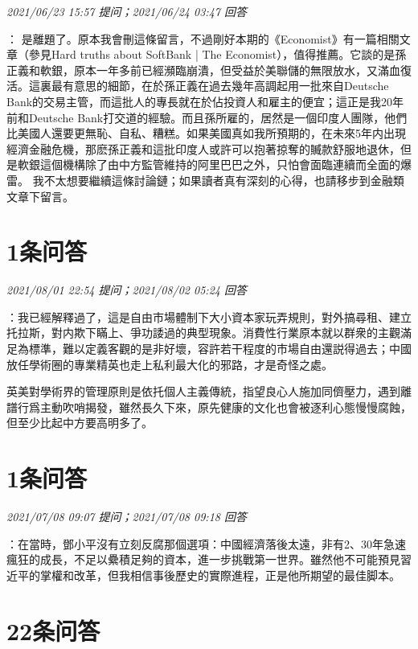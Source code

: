 \documentclass[twocolumn]{ctexart}
\begin{document}
\textit{\hfill\noindent\small 2021/06/23 15:57 提问；2021/06/24 03:47 回答}

：
是離題了。原本我會刪這條留言，不過剛好本期的《Economist》有一篇相關文章（參見Hard truths about SoftBank | The Economist），值得推薦。它談的是孫正義和軟銀，原本一年多前已經瀕臨崩潰，但受益於美聯儲的無限放水，又滿血復活。這裏最有意思的細節，在於孫正義在過去幾年高調起用一批來自Deutsche Bank的交易主管，而這批人的專長就在於佔投資人和雇主的便宜；這正是我20年前和Deutsche Bank打交道的經驗。而且孫所雇的，居然是一個印度人團隊，他們比美國人還要更無恥、自私、糟糕。如果美國真如我所預期的，在未來5年内出現經濟金融危機，那麽孫正義和這批印度人或許可以抱著掠奪的贓款舒服地退休，但是軟銀這個機構除了由中方監管維持的阿里巴巴之外，只怕會面臨連續而全面的爆雷。
我不太想要繼續這條討論鏈；如果讀者真有深刻的心得，也請移步到金融類文章下留言。
\\

\section{1条问答}

\textit{\hfill\noindent\small 2021/08/01 22:54 提问；2021/08/02 05:24 回答}

：我已經解釋過了，這是自由市場體制下大小資本家玩弄規則，對外搞尋租、建立托拉斯，對内欺下瞞上、爭功諉過的典型現象。消費性行業原本就以群衆的主觀滿足為標準，難以定義客觀的是非好壞，容許若干程度的市場自由還説得過去；中國放任學術圈的專業精英也走上私利最大化的邪路，才是奇怪之處。

英美對學術界的管理原則是依托個人主義傳統，指望良心人施加同儕壓力，遇到離譜行爲主動吹哨揭發，雖然長久下來，原先健康的文化也會被逐利心態慢慢腐蝕，但至少比起中方要高明多了。
\\

\section{1条问答}

\textit{\hfill\noindent\small 2021/07/08 09:07 提问；2021/07/08 09:18 回答}

：在當時，鄧小平沒有立刻反腐那個選項：中國經濟落後太遠，非有2、30年急速瘋狂的成長，不足以纍積足夠的資本，進一步挑戰第一世界。雖然他不可能預見習近平的掌權和改革，但我相信事後歷史的實際進程，正是他所期望的最佳脚本。
\\

\section{22条问答}
\end{document}
